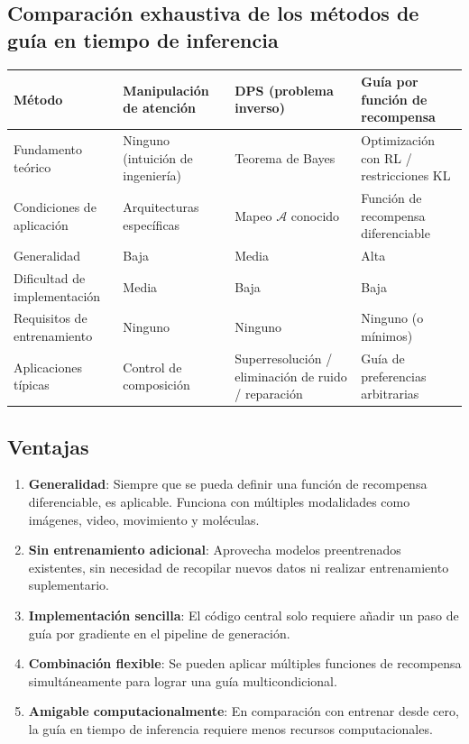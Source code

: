 \documentclass[a4paper]{article}
\begin{document}
\subsection{Comparación exhaustiva de los métodos de guía en tiempo de inferencia}

\begin{center}
\begin{tabular}{p{3cm}p{3.5cm}p{3.5cm}p{3.5cm}}
\toprule
\textbf{Método} & \textbf{Manipulación de atención} & \textbf{DPS (problema inverso)} & \textbf{Guía por función de recompensa} \\
\midrule
Fundamento teórico & Ninguno (intuición de ingeniería) & Teorema de Bayes & Optimización con RL / restricciones KL \\
Condiciones de aplicación & Arquitecturas específicas & Mapeo $\mathcal{A}$ conocido & Función de recompensa diferenciable \\
Generalidad & Baja & Media & Alta \\
Dificultad de implementación & Media & Baja & Baja \\
Requisitos de entrenamiento & Ninguno & Ninguno & Ninguno (o mínimos) \\
Aplicaciones típicas & Control de composición & Superresolución / eliminación de ruido / reparación & Guía de preferencias arbitrarias \\
\bottomrule
\end{tabular}
\end{center}

\subsection{Ventajas}

\begin{enumerate}
    \item \textbf{Generalidad}: Siempre que se pueda definir una función de recompensa diferenciable, es aplicable. Funciona con múltiples modalidades como imágenes, video, movimiento y moléculas.
    \item \textbf{Sin entrenamiento adicional}: Aprovecha modelos preentrenados existentes, sin necesidad de recopilar nuevos datos ni realizar entrenamiento suplementario.
    \item \textbf{Implementación sencilla}: El código central solo requiere añadir un paso de guía por gradiente en el pipeline de generación.
    \item \textbf{Combinación flexible}: Se pueden aplicar múltiples funciones de recompensa simultáneamente para lograr una guía multicondicional.
    \item \textbf{Amigable computacionalmente}: En comparación con entrenar desde cero, la guía en tiempo de inferencia requiere menos recursos computacionales.
\end{enumerate}
\end{document}
